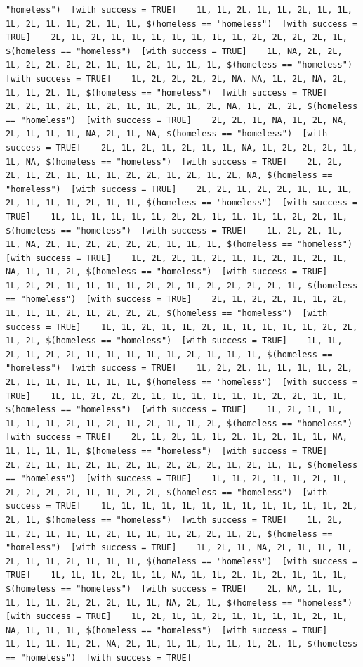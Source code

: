 \documentclass{tufte-book}\usepackage[]{graphicx}\usepackage[]{xcolor}
\makeatletter
\newenvironment{kframe}{%
 \def\at@end@of@kframe{}%
 \ifinner\ifhmode%
  \def\at@end@of@kframe{\end{minipage}}%
  \begin{minipage}{\columnwidth}%
 \fi\fi%
 \def\FrameCommand##1{\hskip\@totalleftmargin \hskip-\fboxsep
 \colorbox{shadecolor}{##1}\hskip-\fboxsep
     \hskip-\linewidth \hskip-\@totalleftmargin \hskip\columnwidth}%
 \MakeFramed {\advance\hsize-\width
   \@totalleftmargin\z@ \linewidth\hsize
   \@setminipage}}%
 {\par\unskip\endMakeFramed%
 \at@end@of@kframe}
\newenvironment{knitrout}{}{} %
\makeatother
\begin{document}
\begin{knitrout}
\begin{kframe}
\begin{verbatim}
"homeless")  [with success = TRUE]    1L, 1L, 2L, 1L, 1L, 2L, 1L, 1L, 1L, 2L, 1L, 1L, 2L, 1L, 1L, $(homeless == "homeless")  [with success = TRUE]    2L, 1L, 2L, 1L, 1L, 1L, 1L, 1L, 1L, 1L, 2L, 2L, 2L, 2L, 1L, $(homeless == "homeless")  [with success = TRUE]    1L, NA, 2L, 2L, 1L, 2L, 2L, 2L, 2L, 1L, 1L, 2L, 1L, 1L, 1L, $(homeless == "homeless")  [with success = TRUE]    1L, 2L, 2L, 2L, 2L, NA, NA, 1L, 2L, NA, 2L, 1L, 1L, 2L, 1L, $(homeless == "homeless")  [with success = TRUE]    2L, 2L, 1L, 2L, 1L, 2L, 1L, 1L, 2L, 1L, 2L, NA, 1L, 2L, 2L, $(homeless == "homeless")  [with success = TRUE]    2L, 2L, 1L, NA, 1L, 2L, NA, 2L, 1L, 1L, 1L, NA, 2L, 1L, NA, $(homeless == "homeless")  [with success = TRUE]    2L, 1L, 2L, 1L, 2L, 1L, 1L, NA, 1L, 2L, 2L, 2L, 1L, 1L, NA, $(homeless == "homeless")  [with success = TRUE]    2L, 2L, 2L, 1L, 2L, 1L, 1L, 1L, 2L, 2L, 1L, 2L, 1L, 2L, NA, $(homeless == "homeless")  [with success = TRUE]    2L, 2L, 1L, 2L, 2L, 1L, 1L, 1L, 2L, 1L, 1L, 1L, 2L, 1L, 1L, $(homeless == "homeless")  [with success = TRUE]    1L, 1L, 1L, 1L, 1L, 1L, 2L, 2L, 1L, 1L, 1L, 1L, 2L, 2L, 1L, $(homeless == "homeless")  [with success = TRUE]    1L, 2L, 2L, 1L, 1L, NA, 2L, 1L, 2L, 2L, 2L, 2L, 1L, 1L, 1L, $(homeless == "homeless")  [with success = TRUE]    1L, 2L, 2L, 1L, 2L, 1L, 1L, 2L, 1L, 2L, 1L, NA, 1L, 1L, 2L, $(homeless == "homeless")  [with success = TRUE]    1L, 2L, 2L, 1L, 1L, 1L, 1L, 2L, 2L, 1L, 2L, 2L, 2L, 2L, 1L, $(homeless == "homeless")  [with success = TRUE]    2L, 1L, 2L, 2L, 1L, 1L, 2L, 1L, 1L, 1L, 2L, 1L, 2L, 2L, 2L, $(homeless == "homeless")  [with success = TRUE]    1L, 1L, 2L, 1L, 1L, 2L, 1L, 1L, 1L, 1L, 1L, 2L, 2L, 1L, 2L, $(homeless == "homeless")  [with success = TRUE]    1L, 1L, 2L, 1L, 2L, 2L, 1L, 1L, 1L, 1L, 1L, 2L, 1L, 1L, 1L, $(homeless == "homeless")  [with success = TRUE]    1L, 2L, 2L, 1L, 1L, 1L, 1L, 2L, 2L, 1L, 1L, 1L, 1L, 1L, 1L, $(homeless == "homeless")  [with success = TRUE]    1L, 1L, 2L, 2L, 2L, 1L, 1L, 1L, 1L, 1L, 1L, 2L, 2L, 1L, 1L, $(homeless == "homeless")  [with success = TRUE]    1L, 2L, 1L, 1L, 1L, 1L, 1L, 2L, 1L, 2L, 1L, 2L, 1L, 1L, 2L, $(homeless == "homeless")  [with success = TRUE]    2L, 1L, 2L, 1L, 1L, 2L, 1L, 2L, 1L, 1L, NA, 1L, 1L, 1L, 1L, $(homeless == "homeless")  [with success = TRUE]    2L, 2L, 1L, 1L, 2L, 1L, 2L, 1L, 2L, 2L, 2L, 1L, 2L, 1L, 1L, $(homeless == "homeless")  [with success = TRUE]    1L, 1L, 2L, 1L, 1L, 2L, 1L, 2L, 2L, 2L, 2L, 1L, 1L, 2L, 2L, $(homeless == "homeless")  [with success = TRUE]    1L, 1L, 1L, 1L, 1L, 1L, 1L, 1L, 1L, 1L, 1L, 1L, 2L, 2L, 1L, $(homeless == "homeless")  [with success = TRUE]    1L, 2L, 1L, 2L, 1L, 1L, 1L, 2L, 1L, 1L, 1L, 2L, 2L, 1L, 2L, $(homeless == "homeless")  [with success = TRUE]    1L, 2L, 1L, NA, 2L, 1L, 1L, 1L, 2L, 1L, 1L, 2L, 1L, 1L, 1L, $(homeless == "homeless")  [with success = TRUE]    1L, 1L, 1L, 2L, 1L, 1L, NA, 1L, 1L, 2L, 1L, 2L, 1L, 1L, 1L, $(homeless == "homeless")  [with success = TRUE]    2L, NA, 1L, 1L, 1L, 1L, 1L, 2L, 2L, 2L, 1L, 1L, NA, 2L, 1L, $(homeless == "homeless")  [with success = TRUE]    1L, 2L, 1L, 1L, 2L, 1L, 1L, 1L, 1L, 2L, 1L, NA, 1L, 1L, 1L, $(homeless == "homeless")  [with success = TRUE]    1L, 1L, 1L, 1L, 2L, NA, 2L, 1L, 1L, 1L, 1L, 1L, 1L, 2L, 1L, $(homeless == "homeless")  [with success = TRUE]    
\end{verbatim}
\end{kframe}
\end{knitrout}
\end{document}
